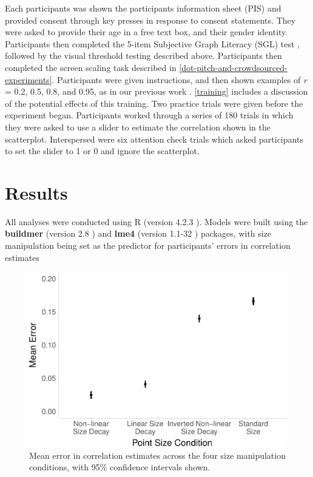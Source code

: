 \documentclass{vgtc}                          %
\begin{document}
Each participants was shown the participants information sheet (PIS) and provided
consent through key presses in response to consent statements. They were asked
to provide their age in a free text box, and their gender identity. Participants
then completed the 5-item Subjective Graph Literacy (SGL) test \cite{garcia_2016},
followed by the visual threshold testing described above. Participants then completed
the screen scaling task described in \autoref{dot-pitch-and-crowdsourced-experiments}.
Participants were given instructions, and then shown examples of \emph{r} = 0.2, 0.5, 0.8, and
0.95, as in our previous work \cite{strain_2023}. \autoref{training} includes
a discussion of the potential effects of this training. Two practice trials were
given before the experiment began. Participants worked through a series of 180 trials
in which they were asked to use a slider to estimate the correlation shown in
the scatterplot. Interspersed were six attention check trials which asked
participants to set the slider to 1 or 0 and ignore the scatterplot.

\hypertarget{results}{%
\section{Results}\label{results}}

All analyses were conducted using R (version 4.2.3 \cite{r_core}). Models were
built using the \textbf{buildmer} (version 2.8 \cite{voeten_buildmer_2022}) and \textbf{lme4}
(version 1.1-32 \cite{bates_lme4_2015}) packages, with size manipulation being set
as the predictor for participants' errors in correlation estimates

\begin{figure}
\includegraphics[width=1\linewidth]{size_and_scatterplots_files/figure-latex/dot-plot-1} \caption{Mean error in correlation estimates across the four size manipulation conditions, with 95\% confidence intervals shown.}\label{fig:dot-plot}
\end{figure}
\end{document}
